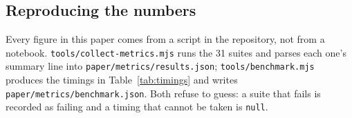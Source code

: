 \subsection{Reproducing the numbers}

Every figure in this paper comes from a script in the repository, not from a notebook.
\texttt{tools/\allowbreak collect-metrics.mjs} runs the 31 suites and parses each one's summary line into
\texttt{paper/\allowbreak metrics/\allowbreak results.json}; \texttt{tools/\allowbreak benchmark.mjs} produces the timings in
Table~\ref{tab:timings} and writes \texttt{paper/\allowbreak metrics/\allowbreak benchmark.json}. Both refuse to guess:
a suite that fails is recorded as failing and a timing that cannot be taken is \texttt{null}.
